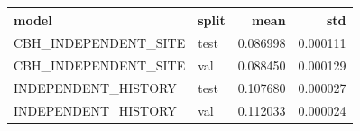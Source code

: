 \begin{tabular}{llrr}
\toprule
model & split & mean & std \\
\midrule
CBH\_INDEPENDENT\_SITE & test & 0.086998 & 0.000111 \\
CBH\_INDEPENDENT\_SITE & val & 0.088450 & 0.000129 \\
INDEPENDENT\_HISTORY & test & 0.107680 & 0.000027 \\
INDEPENDENT\_HISTORY & val & 0.112033 & 0.000024 \\
\bottomrule
\end{tabular}
